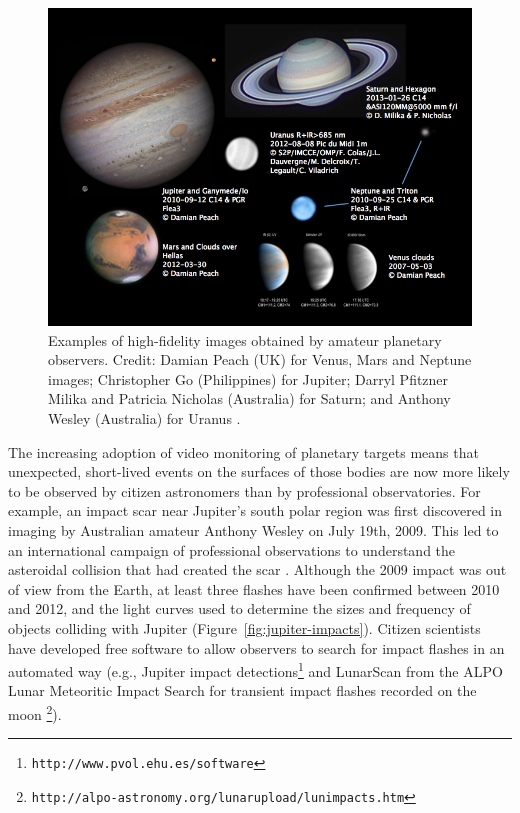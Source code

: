 \documentclass{ar2e}
\def\Fref#1{Figure~\ref{#1}\xspace}
\def\CaseStudy#1{\noindent{\it\bf #1 \,\,\,\,}}
\def\url#1{\texttt{#1}}
\begin{document}
\begin{figure}[!ht]
\centering\includegraphics[width=\linewidth]{figs/planets.png}
\caption{Examples of high-fidelity images obtained by amateur planetary
observers.  Credit:  Damian Peach (UK) for Venus, Mars and Neptune images;
Christopher Go (Philippines) for Jupiter; Darryl Pfitzner Milika and Patricia
Nicholas (Australia) for Saturn; and Anthony Wesley (Australia) for Uranus
\citep[see][for a thorough review of amateur planetary
astronomy]{14mousis_proam}.}
\label{fig:planets}
\end{figure}



\CaseStudy{Solar System Impacts.}
The increasing adoption of video monitoring of planetary targets means that
unexpected, short-lived events on the surfaces of those bodies 
are now more likely to be observed by citizen
astronomers than by professional observatories.  For example, an impact scar
near Jupiter's south polar region was first discovered in imaging by Australian
amateur Anthony Wesley on July 19th, 2009. This led to an international campaign
of professional observations to understand the asteroidal collision that had
created the scar \citep[e.g.,][]{10hammel,10depater,11orton}.  Although the 2009
impact was out of view from the Earth, at least three flashes have been
confirmed between 2010 and 2012, and the light curves used to determine the
sizes and frequency of objects colliding with Jupiter \citep[e.g.,][]{13hueso}
(\Fref{fig:jupiter-impacts}).  Citizen scientists have developed free software
to allow observers to search for impact flashes in an automated way (e.g.,
Jupiter impact detections\footnote{\url{http://www.pvol.ehu.es/software}} and
LunarScan from the ALPO Lunar Meteoritic Impact Search for transient impact
flashes recorded on the moon
\footnote{\url{http://alpo-astronomy.org/lunarupload/lunimpacts.htm}}).  
\end{document}

